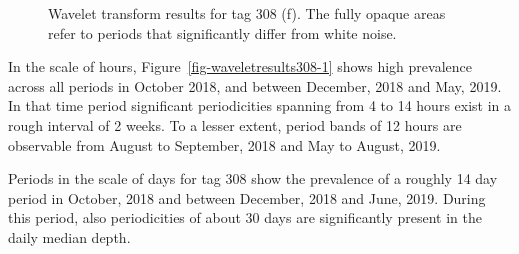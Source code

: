 \documentclass[
  authoryear,
  review,
  3p]{elsarticle}
\begin{document}
\begin{figure}

\begin{minipage}[t]{\linewidth}

{\centering 


}

\end{minipage}%
\newline
\begin{minipage}[t]{\linewidth}

{\centering 


}

\end{minipage}%

\caption{\label{fig-waveletresults308}Wavelet transform results for tag
308 (f). The fully opaque areas refer to periods that significantly
differ from white noise.}

\end{figure}

In the scale of hours, Figure~\ref{fig-waveletresults308-1} shows high
prevalence across all periods in October 2018, and between December,
2018 and May, 2019. In that time period significant periodicities
spanning from 4 to 14 hours exist in a rough interval of 2 weeks. To a
lesser extent, period bands of 12 hours are observable from August to
September, 2018 and May to August, 2019.

Periods in the scale of days for tag 308 show the prevalence of a
roughly 14 day period in October, 2018 and between December, 2018 and
June, 2019. During this period, also periodicities of about 30 days are
significantly present in the daily median depth.
\end{document}
